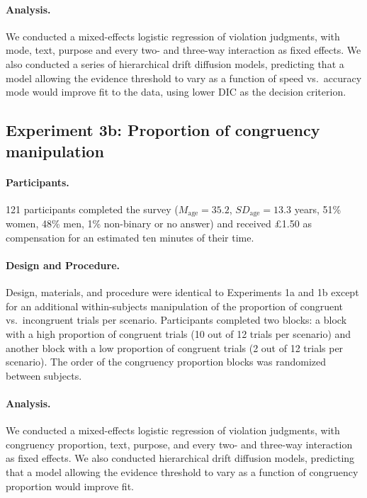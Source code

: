 \documentclass[pdflatex,sn-nature]{sn-jnl}
\begin{document}
\paragraph{Analysis.}
We conducted a mixed-effects logistic regression of violation judgments, with mode, text, purpose and every two- and three-way interaction as fixed effects. We also conducted a series of hierarchical drift diffusion models, predicting that a model allowing the evidence threshold to vary as a function of speed vs.\ accuracy mode would improve fit to the data, using lower DIC as the decision criterion.

\subsection{Experiment 3b: Proportion of congruency manipulation}\label{subsec:exp3b}

\paragraph{Participants.}
121 participants completed the survey ($M_\text{age} = 35.2$, $\mathit{SD}_\text{age} = 13.3$ years, 51\% women, 48\% men, 1\% non-binary or no answer) and received £1.50 as compensation for an estimated ten minutes of their time.

\paragraph{Design and Procedure.}
Design, materials, and procedure were identical to Experiments 1a and 1b except for an additional within-subjects manipulation of the proportion of congruent vs.\ incongruent trials per scenario. Participants completed two blocks: a block with a high proportion of congruent trials (10 out of 12 trials per scenario) and another block with a low proportion of congruent trials (2 out of 12 trials per scenario). The order of the congruency proportion blocks was randomized between subjects.

\paragraph{Analysis.}
We conducted a mixed-effects logistic regression of violation judgments, with congruency proportion, text, purpose, and every two- and three-way interaction as fixed effects. We also conducted hierarchical drift diffusion models, predicting that a model allowing the evidence threshold to vary as a function of congruency proportion would improve fit.
\end{document}

